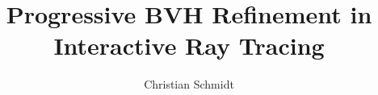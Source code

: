 \documentclass[11pt,a4paper]{article}
\title{Progressive BVH Refinement in Interactive Ray Tracing}
\author{Christian Schmidt}
\begin{document}
\makecover
\maketaskdescription
\makededication
\makeabstract
\makenotation
\maketoc
\cleardoublepage









\cleardoublepage
\printglossaries
\cleardoublepage

\end{document}
